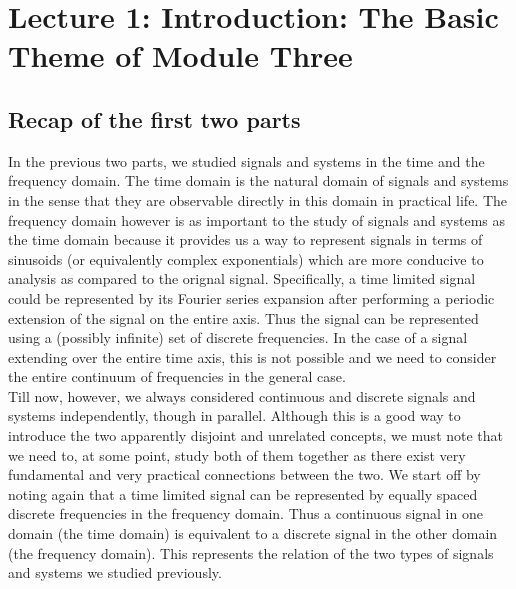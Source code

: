 \section{Lecture 1: Introduction: The Basic Theme of Module Three}

\subsection{Recap of the first two parts}
In the previous two parts, we studied signals and systems in the time and the frequency domain. The time domain is the natural domain of signals and systems in the sense that they are observable directly in this domain in practical life. The frequency domain however is as important to the study of signals and systems as the time domain because it provides us a way to represent signals in terms of sinusoids (or equivalently complex exponentials) which are more conducive to analysis as compared to the orignal signal. Specifically, a time limited signal could be represented by its Fourier series expansion after performing a periodic extension of the signal on the entire axis. Thus the signal can be represented using a (possibly infinite) set of discrete frequencies. In the case of a signal extending over the entire time axis, this is not possible and we need to consider the entire continuum of frequencies in the general case.\\
Till now, however, we always considered continuous and discrete signals and systems independently, though in parallel. Although this is a good way to introduce the two apparently disjoint and unrelated concepts, we must note that we need to, at some point, study both of them together as there exist very fundamental and very practical connections between the two. We start off by noting again that a time limited signal can be represented by equally spaced discrete frequencies in the frequency domain. Thus a continuous signal in one domain (the time domain) is equivalent to a discrete signal in the other domain (the frequency domain). This represents the relation of the two types of signals and systems we studied previously.


